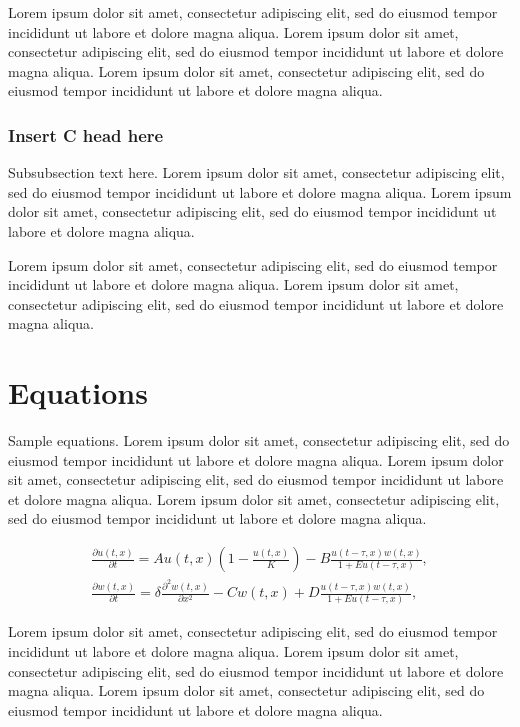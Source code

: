 \documentclass[
  journal=small,
  manuscript=article-type,  %
  year=2020,
  volume=37,
]{cup-journal}
\begin{document}
 Lorem ipsum dolor sit amet, consectetur adipiscing elit, sed do eiusmod tempor incididunt ut labore et dolore magna aliqua. Lorem ipsum dolor sit amet, consectetur adipiscing elit, sed do eiusmod tempor incididunt ut labore et dolore magna aliqua. Lorem ipsum dolor sit amet, consectetur adipiscing elit, sed do eiusmod tempor incididunt ut labore et dolore magna aliqua. 

\subsubsection{Insert C head here}
Subsubsection text here. Lorem ipsum dolor sit amet, consectetur adipiscing elit, sed do eiusmod tempor incididunt ut labore et dolore magna aliqua. 
Lorem ipsum dolor sit amet, consectetur adipiscing elit, sed do eiusmod tempor incididunt ut labore et dolore magna aliqua. 

Lorem ipsum dolor sit amet, consectetur adipiscing elit, sed do eiusmod tempor incididunt ut labore et dolore magna aliqua. Lorem ipsum dolor sit amet, consectetur adipiscing elit, sed do eiusmod tempor incididunt ut labore et dolore magna aliqua. 

\section{Equations}

Sample equations. Lorem ipsum dolor sit amet, consectetur adipiscing elit, sed do eiusmod tempor incididunt ut labore et dolore magna aliqua. Lorem ipsum dolor sit amet, consectetur adipiscing elit, sed do eiusmod tempor incididunt ut labore et dolore magna aliqua. Lorem ipsum dolor sit amet, consectetur adipiscing elit, sed do eiusmod tempor incididunt ut labore et dolore magna aliqua. 


\begin{equation}
\begin{aligned}\label{eq:first}
\frac{\partial u(t,x)}{\partial t} = Au(t,x) \left(1-\frac{u(t,x)}{K}\right)
 -B\frac{u(t-\tau,x) w(t,x)}{1+Eu(t-\tau,x)},\\
\frac{\partial w(t,x)}{\partial t} =\delta \frac{\partial^2w(t,x)}{\partial x^2}-Cw(t,x)
+D\frac{u(t-\tau,x)w(t,x)}{1+Eu(t-\tau,x)},
\end{aligned}
\end{equation}

 Lorem ipsum dolor sit amet, consectetur adipiscing elit, sed do eiusmod tempor incididunt ut labore et dolore magna aliqua. Lorem ipsum dolor sit amet, consectetur adipiscing elit, sed do eiusmod tempor incididunt ut labore et dolore magna aliqua. Lorem ipsum dolor sit amet, consectetur adipiscing elit, sed do eiusmod tempor incididunt ut labore et dolore magna aliqua. 
\end{document}
